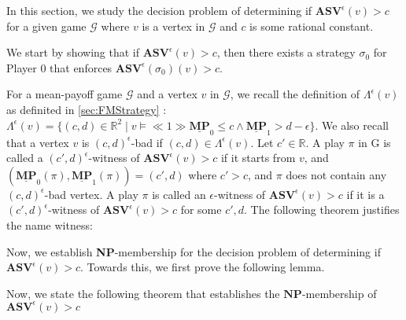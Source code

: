 In this section, we study the decision problem of determining if $\mathbf{ASV}^{\epsilon}(v) > c$  for a given game $\mathcal{G}$ where $v$ is a vertex in $\mathcal{G}$ and $c$ is some rational constant.

We start by showing that if $\mathbf{ASV}^{\epsilon}(v) > c$, then there exists a strategy $\sigma_0$ for Player 0 that enforces $\mathbf{ASV}^{\epsilon}(\sigma_0)(v) > c$.



For a mean-payoff game $\mathcal{G}$ and a vertex $v$ in $\mathcal{G}$, we recall the definition of $\Lambda^{\epsilon}(v)$ as definited in \cref{sec:FMStrategy} : $\Lambda^{\epsilon}(v) = \{(c,d) \in \mathbb{R}^2 \mid v \models \ll 1 \gg \underline{\mathbf{MP}}_0 \leqslant c \land \underline{\mathbf{MP}}_1 > d-\epsilon \}$. We also recall that a vertex $v$ is $(c,d)^{\epsilon}$-bad if $(c,d) \in \Lambda^{\epsilon}(v)$. Let $c' \in \mathbb{R}$. A play $\pi$ in G is called a $(c',d)^{\epsilon}$-witness of $\mathbf{ASV}^{\epsilon}(v) > c$ if it starts from $v$, and $(\underline{\mathbf{MP}}_0(\pi), \underline{\mathbf{MP}}_1(\pi)) = (c', d)$ where $c' > c$, and $\pi$ does not contain any $(c,d)^{\epsilon}$-bad vertex. A play $\pi$ is called an $\epsilon$-witness of $\mathbf{ASV}^{\epsilon}(v) > c$ if it is a $(c',d)^{\epsilon}$-witness of $\mathbf{ASV}^{\epsilon}(v) > c$ for some $c',d$. The following theorem justifies the name witness:



Now, we establish \textbf{NP}-membership for the decision problem of determining if $\mathbf{ASV}^{\epsilon}(v) > c$. Towards this, we first prove the following lemma.



Now, we state the following theorem that establishes the $\mathbf{NP}$-membership of $\mathbf{ASV}^{\epsilon}(v) > c$
